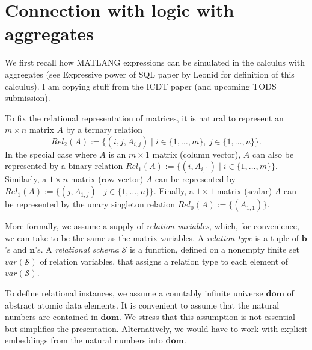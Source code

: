 \section{Connection with logic with aggregates}
\newcommand{\ML}{\mathsf{MATLANG}}
\newcommand{\reals}{\mathbf{R}}
\newcommand{\cmplx}{\mathbf{C}}
\newcommand{\nat}{\mathbf{N}}
\newcommand{\pnat}{\nat_{>0}}
\newcommand{\var}{var}
\newcommand{\scm}{\mathcal{S}}
\newcommand{\sizevar}{\mathsf{SizeVars}}
\newcommand{\mname}{\mathsf{MatNames}}
\newcommand{\allinst}[1]{\mathcal{I}_{#1}}
\newcommand{\cmats}{\mathcal{M}}
\newcommand{\false}{\bot}
\newcommand{\true}{\top}
\newcommand{\boolinterp}{\nu}
\newcommand{\Rel}{\mathit{Rel}}
\newcommand{\Mat}{\mathit{Mat}}
\newcommand{\one}{\mathbf{1}}
\newcommand{\Sum}{\mathsf{sum}}
\newcommand{\diag}{\mathsf{diag}}
\newcommand{\Apply}{\mathsf{apply}}
\newcommand{\Tb}{\mathbf{b}}
\newcommand{\Tn}{\mathbf{n}}
\newcommand{\dom}{\mathbf{dom}}
\newcommand{\rname}{\mathsf{RelNames}}
\newtheorem{proposition}{Proposition}
We first recall how MATLANG expressions can be simulated in the calculus with aggregates (see Expressive power of SQL paper by Leonid
for definition of this calculus). I am copying stuff from the ICDT paper (and upcoming TODS submission).

To fix the relational representation of matrices, it is natural to represent an $m \times n$ matrix $A$
by a ternary relation $$
\Rel_2(A) := \{(i,j,A_{i,j}) \mid i \in \{1,\dots,m\}, \ j \in
\{1,\dots,n\}\}. $$  In the special case where $A$ is an
$m \times 1$ matrix (column
vector), $A$ can also be represented by a binary relation
$\Rel_1(A) :=
\{(i,A_{i,1}) \mid i \in \{1,\dots,m\}\}$.  Similarly, a $1
\times n$ matrix (row vector) $A$ can be represented by $\Rel_1(A)
:= \{(j,A_{1,j}) \mid j \in \{1,\dots,n\}\}$.  Finally, a $1
\times 1$ matrix (scalar) $A$ can be represented by the unary
singleton relation $\Rel_0(A) := \{(A_{1,1})\}$. 

More formally,
we assume a supply of \emph{relation variables}, which, for
convenience, we can take to be the same as the matrix variables.
A \emph{relation type} is a tuple of $\Tb$'s and $\Tn$'s.
A \emph{relational schema} $\scm$ is a function, defined on a
nonempty finite set
$\var(\scm)$ of relation variables, that assigns a relation type
to each element of $\var(\scm)$.

To define relational instances, we assume a countably infinite universe
$\dom$ of abstract atomic data elements.  It is convenient to
assume that the natural numbers are contained in $\dom$.  We
stress that this assumption is not essential but simplifies the
presentation.  Alternatively, we would have to work with explicit
embeddings from the natural numbers into $\dom$.

